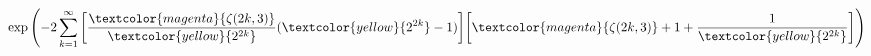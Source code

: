 $\exp \Bigg({-2} \displaystyle\sum_{k=1}^{\infty} \bigg\lbrack\dfrac{\textcolor{magenta}{\zeta(2k, 3)}} {\textcolor{yellow}{2^{2k}}} (\textcolor{yellow}{2^{2k}} - 1)\bigg\rbrack \bigg\lbrack\textcolor{magenta}{\zeta(2k, 3)} + 1 + \dfrac{1}{\textcolor{yellow}{2^{2k}}}\bigg\rbrack\Bigg)$
